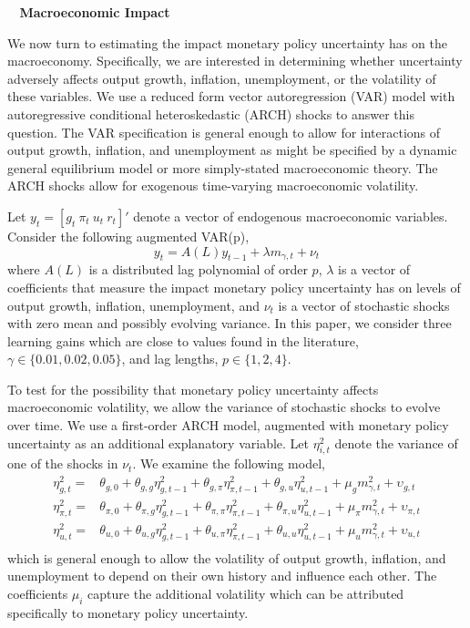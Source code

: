 \documentclass[12pt]{article}
\newcommand{\beq}{\begin{equation}}
\newcommand{\eeq}{\end{equation}}
\renewcommand{\section}[1]{\addtocounter{section}{1} \begin{center}\textbf{\thesection~ #1}\end{center}}
\begin{document}
\section{Macroeconomic Impact}
We now turn to estimating the impact monetary policy uncertainty has on the macroeconomy.  Specifically, we are interested in determining whether uncertainty adversely affects output growth, inflation, unemployment, or the volatility of these variables.  We use a reduced form vector autoregression (VAR) model with autoregressive conditional heteroskedastic (ARCH) shocks to answer this question.  The VAR specification is general enough to allow for interactions of output growth, inflation, and unemployment as might be specified by a dynamic general equilibrium model or more simply-stated macroeconomic theory.  The ARCH shocks allow for exogenous time-varying macroeconomic volatility.  

Let $y_t = [g_t~ \pi_t~ u_t~ r_t]'$ denote a vector of endogenous macroeconomic variables. Consider the following augmented VAR(p),
\beq \label{eq:var} y_t = A(L) y_{t-1} + \lambda m_{\gamma,t} + \nu_{t} \eeq
where $A(L)$ is a distributed lag polynomial of order $p$, $\lambda$ is a vector of coefficients that measure the impact monetary policy uncertainty has on levels of output growth, inflation, unemployment, and $\nu_t$ is a vector of stochastic shocks with zero mean and possibly evolving variance.  In this paper, we consider three learning gains which are close to values found in the literature, $\gamma \in \{0.01, 0.02, 0.05\}$, and lag lengths, $p\in\{1,2,4\}$.

To test for the possibility that monetary policy uncertainty affects macroeconomic volatility, we allow the variance of stochastic shocks to evolve over time.  We use a first-order ARCH model, augmented with monetary policy uncertainty as an additional explanatory variable.  Let $\eta_{i,t}^2$ denote the variance of one of the shocks in $\nu_t$.  We examine the following model,
\beq \label{eq:arch}  \begin{array}{cc}
\eta_{g,t}^2 = & \theta_{g,0} + \theta_{g,g} \eta_{g,t-1}^2 + \theta_{g,\pi} \eta_{\pi,t-1}^2  + \theta_{g,u} \eta_{u,t-1}^2 + \mu_g m_{\gamma,t}^2 + \upsilon_{g,t} \\ [0.5pc]
\eta_{\pi,t}^2 = & \theta_{\pi,0} + \theta_{\pi,g} \eta_{g,t-1}^2 + \theta_{\pi,\pi} \eta_{\pi,t-1}^2 + \theta_{\pi,u} \eta_{u,t-1}^2  + \mu_\pi m_{\gamma,t}^2 + \upsilon_{\pi,t} \\ [0.5pc]
\eta_{u,t}^2 = & \theta_{u,0} + \theta_{u,g} \eta_{g,t-1}^2 + \theta_{u,\pi} \eta_{\pi,t-1}^2 + \theta_{u,u} \eta_{u,t-1}^2  + \mu_u m_{\gamma,t}^2 + \upsilon_{u,t} \\ 
\end{array}
\eeq
which is general enough to allow the volatility of output growth, inflation, and unemployment to depend on their own history and influence each other.  The coefficients $\mu_i$ capture the additional volatility which can be attributed specifically to monetary policy uncertainty.
\end{document}
